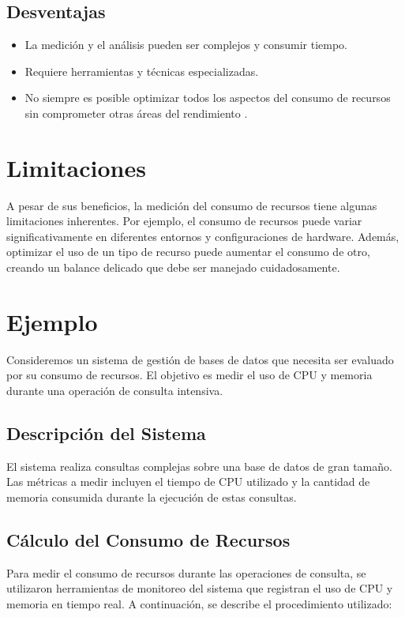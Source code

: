 \documentclass{article}
\begin{document}
\subsection{Desventajas}
\begin{itemize}
    \item La medición y el análisis pueden ser complejos y consumir tiempo.
    \item Requiere herramientas y técnicas especializadas.
    \item No siempre es posible optimizar todos los aspectos del consumo de recursos sin comprometer otras áreas del rendimiento \cite{jones2008applied}.
\end{itemize}


\section{Limitaciones}
A pesar de sus beneficios, la medición del consumo de recursos tiene algunas limitaciones inherentes. Por ejemplo, el consumo de recursos puede variar significativamente en diferentes entornos y configuraciones de hardware. Además, optimizar el uso de un tipo de recurso puede aumentar el consumo de otro, creando un balance delicado que debe ser manejado cuidadosamente.

\pagebreak
\section{Ejemplo}
Consideremos un sistema de gestión de bases de datos que necesita ser evaluado por su consumo de recursos. El objetivo es medir el uso de CPU y memoria durante una operación de consulta intensiva.

\subsection{Descripción del Sistema}
El sistema realiza consultas complejas sobre una base de datos de gran tamaño. Las métricas a medir incluyen el tiempo de CPU utilizado y la cantidad de memoria consumida durante la ejecución de estas consultas.

\subsection{Cálculo del Consumo de Recursos}
Para medir el consumo de recursos durante las operaciones de consulta, se utilizaron herramientas de monitoreo del sistema que registran el uso de CPU y memoria en tiempo real. A continuación, se describe el procedimiento utilizado:
\end{document}
